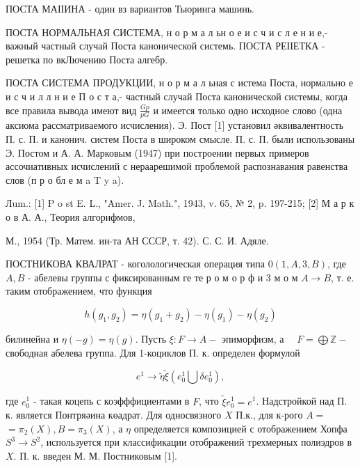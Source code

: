 \documentclass[10pt]{article}
\begin{document}
ПОСТА МАІІИНА - один вз вариантов Тьюринга машинь.



ПОСТА НОРМАЛЬНАЯ СИСТЕМА, н о р м а л ьн о е и с ч и с л е н и е,- важный частный случай Поста канонической системь. ПОСТА РЕІІЕТКА - решетка по вкЛючению Поста алгебр.



ПОСТА СИСТЕМА ПРОДУКЦИИ, н о р м а л ьная с истема Поста, нормально е и с ч и л л н и е П о с т а,- частный случай Поста канонической системы, когда все правила вывода имеют вид $\frac{G p}{p G}$ и имеется только одно исходное слово (одна аксиома рассматриваемого исчисления). Э. Пост [1] установил әквивалентность П. с. П. и канонич. систем Поста в широком смысле. П. с. П. были использованы Э. Постом и А. А. Марковым (1947) при построении первых примеров ассочиативных исчислений с нераарешимой проблемой распознавания равенства слов (п р о бл е м a T y a).



Лum.: [1] P o st E. L., "Amer. J. Math.", 1943, v. 65, № 2, p. 197-215; [2] М а р к о в А. А., Теория алгорифмов,



М., 1954 (Тр. Матем. ин-та АН СССР, т. 42). С. С. И. Адяле.

ПОСТНИКОВА КВАЛРАТ - коголологическая операция типа $0(1, A, 3, B)$, где $A, B$ - абелевы группы с фиксированным ге те р о м о р ф и 3 м о м $A \rightarrow B$, т. е. таким отображением, что функция



\[

h\left(g_{1}, g_{2}\right)=\eta\left(g_{1}+g_{2}\right)-\eta\left(g_{1}\right)-\eta\left(g_{2}\right)

\]



билинейна и $\eta(-g)=\eta(g)$. Пусть $\xi: F \rightarrow A-$ эпиморфизм, а $\quad F=\bigoplus \mathbb{Z}-$ свободная абелева группа. Для 1-коциклов П. к. определен формулой



\[

e^{1} \longrightarrow \tilde{\eta} \tilde{\xi}\left(e_{0}^{1} \bigcup \delta e_{0}^{1}\right),

\]



где $e_{0}^{1}$ - такая коцепь с коэфффициентами в $F$, что $\tilde{\xi} e_{0}^{1}=e^{1}$. Надстройкой над П. к. является Понтряәина көадрат. Для односвязного $X$ П.к., для к-рого $A=$ $=\pi_{2}(X), B=\pi_{3}(X)$, а $\eta$ определяется композицией с отображением Хопфа $S^{3} \rightarrow S^{2}$, используется при классификации отображений трехмерных полиэдров в $X$. П. к. введен М. М. Постниковым [1].
\end{document}
